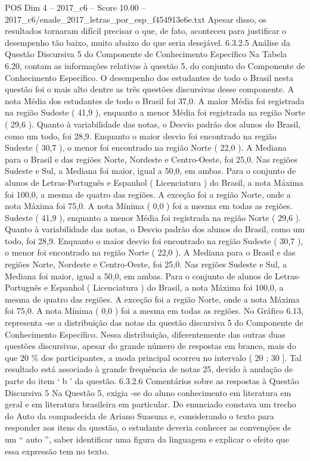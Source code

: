 \begin{textsample}{POS Dim 4 – 2017\_c6 – Score 10.00 – 2017\_c6/enade\_2017\_letras\_por\_esp\_f454913e6e.txt}
Apesar disso, os resultados tornaram difícil precisar o que, de fato, aconteceu para justificar o desempenho tão baixo, muito abaixo do que seria desejável. 6.3.2.5 Análise da Questão Discursiva 5 do Componente de Conhecimento Específico Na Tabela 6.20, contam as informações relativas à questão 5, do conjunto do Componente de Conhecimento Específico.
O desempenho dos estudantes de todo o Brasil nesta questão foi o mais alto dentre as três questões discursivas desse componente.
A nota Média dos estudantes de todo o Brasil foi 37,0.
A maior Média foi registrada na região Sudeste ( 41,9 ), enquanto a menor Média foi registrada na região Norte ( 29,6 ).
Quanto à variabilidade das notas, o Desvio padrão dos alunos do Brasil, como um todo, foi 28,9.
Enquanto o maior desvio foi encontrado na região Sudeste ( 30,7 ), o menor foi encontrado na região Norte ( 22,0 ).
A Mediana para o Brasil e das regiões Norte, Nordeste e Centro-Oeste, foi 25,0.
Nas regiões Sudeste e Sul, a Mediana foi maior, igual a 50,0, em ambas.
Para o conjunto de alunos de Letras-Português e Espanhol ( Licenciatura ) do Brasil, a nota Máxima foi 100,0, a mesma de quatro das regiões.
A exceção foi a região Norte, onde a nota Máxima foi 75,0.
A nota Mínima ( 0,0 ) foi a mesma em todas as regiões.
Sudeste ( 41,9 ), enquanto a menor Média foi registrada na região Norte ( 29,6 ).
Quanto à variabilidade das notas, o Desvio padrão dos alunos do Brasil, como um todo, foi 28,9.
Enquanto o maior desvio foi encontrado na região Sudeste ( 30,7 ), o menor foi encontrado na região Norte ( 22,0 ).
A Mediana para o Brasil e das regiões Norte, Nordeste e Centro-Oeste, foi 25,0.
Nas regiões Sudeste e Sul, a Mediana foi maior, igual a 50,0, em ambas.
Para o conjunto de alunos de Letras-Português e Espanhol ( Licenciatura ) do Brasil, a nota Máxima foi 100,0, a mesma de quatro das regiões.
A exceção foi a região Norte, onde a nota Máxima foi 75,0.
A nota Mínima ( 0,0 ) foi a mesma em todas as regiões.
No Gráfico 6.13, representa -se a distribuição das notas da questão discursiva 5 do Componente de Conhecimento Específico.
Nessa distribuição, diferentemente das outras duas questões discursivas, apesar do grande número de respostas em branco, mais do que 20 \% dos participantes, a moda principal ocorreu no intervalo ( 20 ; 30 ].
Tal resultado está associado à grande frequência de notas 25, devido à anulação de parte do item ‘ b ’ da questão. 6.3.2.6 Comentários sobre as respostas à Questão Discursiva 5 Na Questão 5, exigia -se do aluno conhecimento em literatura em geral e em literatura brasileira em particular.
Do enunciado constava um trecho do Auto da compadecida de Ariano Suasuna e, considerando o texto para responder aos itens da questão, o estudante deveria conhecer as convenções de um “ auto ”, saber identificar uma figura da linguagem e explicar o efeito que essa expressão tem no texto.

\end{textsample}
